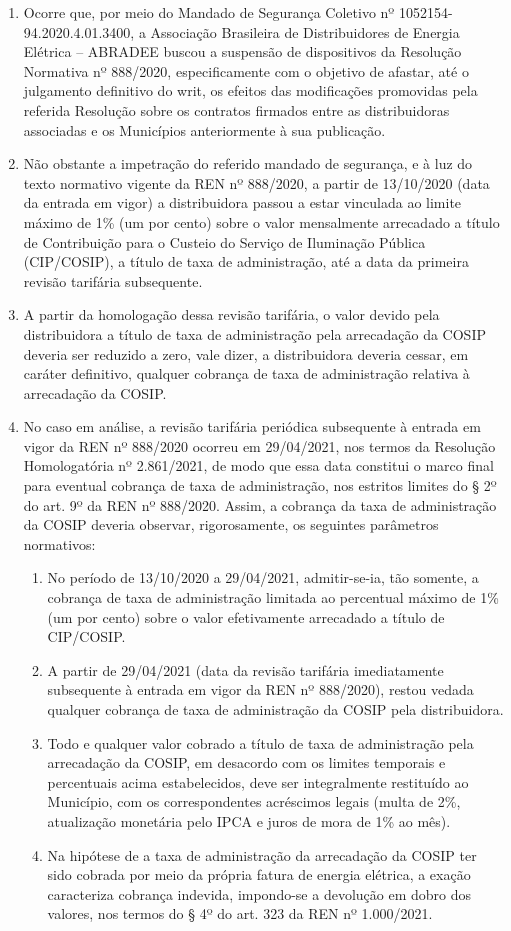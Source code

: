 \begin{enumerate}[resume]
\item Ocorre que, por meio do Mandado de Segurança Coletivo nº 1052154-94.2020.4.01.3400, a Associação Brasileira de Distribuidores de Energia Elétrica – ABRADEE buscou a suspensão de dispositivos da Resolução Normativa nº 888/2020, especificamente com o objetivo de afastar, até o julgamento definitivo do writ, os efeitos das modificações promovidas pela referida Resolução sobre os contratos firmados entre as distribuidoras associadas e os Municípios anteriormente à sua publicação.
\item Não obstante a impetração do referido mandado de segurança, e à luz do texto normativo vigente da REN nº 888/2020, a partir de 13/10/2020 (data da entrada em vigor) a distribuidora passou a estar vinculada ao limite máximo de 1\% (um por cento) sobre o valor mensalmente arrecadado a título de Contribuição para o Custeio do Serviço de Iluminação Pública (CIP/COSIP), a título de taxa de administração, até a data da primeira revisão tarifária subsequente.
\item A partir da homologação dessa revisão tarifária, o valor devido pela distribuidora a título de taxa de administração pela arrecadação da COSIP deveria ser reduzido a zero, vale dizer, a distribuidora deveria cessar, em caráter definitivo, qualquer cobrança de taxa de administração relativa à arrecadação da COSIP.
\item No caso em análise, a revisão tarifária periódica subsequente à entrada em vigor da REN nº 888/2020 ocorreu em 29/04/2021, nos termos da Resolução Homologatória nº 2.861/2021, de modo que essa data constitui o marco final para eventual cobrança de taxa de administração, nos estritos limites do § 2º do art. 9º da REN nº 888/2020.
Assim, a cobrança da taxa de administração da COSIP deveria observar, rigorosamente, os seguintes parâmetros normativos:

    \begin{enumerate}
        \item No período de 13/10/2020 a 29/04/2021, admitir-se-ia, tão somente, a cobrança de taxa de administração limitada ao percentual máximo de 1\% (um por cento) sobre o valor efetivamente arrecadado a título de CIP/COSIP.
        \item A partir de 29/04/2021 (data da revisão tarifária imediatamente subsequente à entrada em vigor da REN nº 888/2020), restou vedada qualquer cobrança de taxa de administração da COSIP pela distribuidora.
        \item Todo e qualquer valor cobrado a título de taxa de administração pela arrecadação da COSIP, em desacordo com os limites temporais e percentuais acima estabelecidos, deve ser integralmente restituído ao Município, com os correspondentes acréscimos legais (multa de 2\%, atualização monetária pelo IPCA e juros de mora de 1\% ao mês).
        \item Na hipótese de a taxa de administração da arrecadação da COSIP ter sido cobrada por meio da própria fatura de energia elétrica, a exação caracteriza cobrança indevida, impondo-se a devolução em dobro dos valores, nos termos do § 4º do art. 323 da REN nº 1.000/2021.
        

\end{enumerate}
\end{enumerate}
